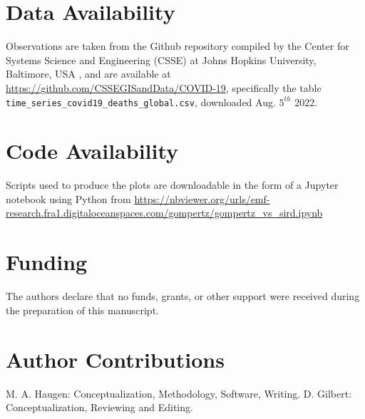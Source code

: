 \documentclass[sn-mathphys]{sn-jnl}%
\theoremstyle{thmstyleone}%
\theoremstyle{thmstyletwo}%
\theoremstyle{thmstylethree}%
\begin{document}
\section*{Data Availability}
Observations are taken from the Github repository compiled by the Center for Systems Science and Engineering (CSSE) at Johns Hopkins University, Baltimore,
USA \cite{dong2020interactive}, and are available at \url{https://github.com/CSSEGISandData/COVID-19}, specifically the table \verb|time_series_covid19_deaths_global.csv|, downloaded Aug. $5^{th}$ 2022.

\section*{Code Availability}

Scripts used to produce the plots are downloadable in the form of a Jupyter notebook using Python from 
\newline
\url{https://nbviewer.org/urls/emf-research.fra1.digitaloceanspaces.com/gompertz/gompertz_vs_sird.ipynb}


\section*{Funding}
The authors declare that no funds, grants, or other support were received during the preparation of this manuscript.


\section*{Author Contributions}
M. A. Haugen: Conceptualization, Methodology, Software, Writing. D. Gilbert: Conceptualization, Reviewing and Editing.





\end{document}
